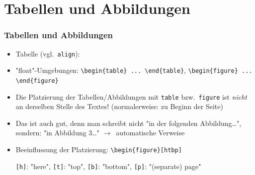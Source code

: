 \section{Tabellen und Abbildungen}

\begin{frame}[<+->][fragile]
	\frametitle{Tabellen und Abbildungen}
	\begin{itemize}
		\item Tabelle (vgl.~\lstinline!align!):
		
		\item "float"-Umgebungen: \lstinline!\begin{table} ... \end{table}!, \lstinline!\begin{figure} ... \end{figure}!
		\item Die Platzierung der Tabellen/Abbildungen mit \lstinline!table! bzw.\ \lstinline!figure! ist \emph{nicht} an derselben Stelle des Textes! (normalerweise: zu Beginn der Seite)
		\item Das ist auch gut, denn man schreibt nicht "in der folgenden Abbildung…", sondern: "in Abbildung 3…"
		$\rightarrow$~automatische Verweise
		\item Beeinflussung der Platzierung: \lstinline!\begin{figure}[htbp]!
		
		\lstinline![h]!: "here", \lstinline![t]!: "top", \lstinline![b]!: "bottom", \lstinline![p]!: "(separate) page"
	\end{itemize}
\end{frame}

